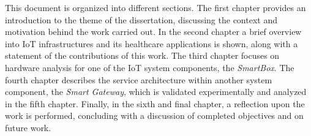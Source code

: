 This document is organized into different sections. The first chapter provides an introduction to the theme of the dissertation, discussing the context and motivation behind the work carried out. In the second chapter a brief overview into \acs{IoT} infrastructures and its healthcare applications is shown, along with a statement of the contributions of this work. The third chapter focuses on hardware analysis for one of the \acs{IoT} system components, the \textit{SmartBox}. The fourth chapter describes the service architecture within another system component, the \textit{Smart Gateway}, which is validated experimentally and analyzed in the fifth chapter.
Finally, in the sixth and final chapter, a reflection upon the work is performed, concluding with a discussion of completed objectives and on future work.